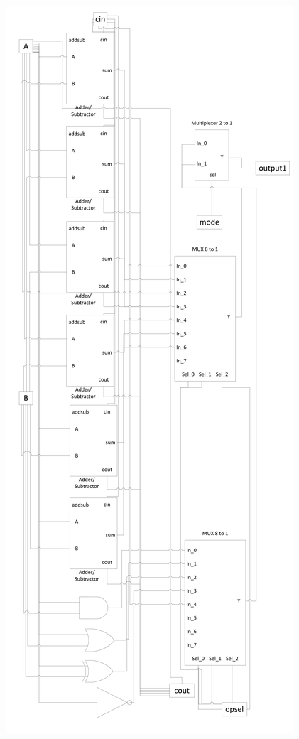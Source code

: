 \documentclass[paper=letter, fontsize=11pt]{scrartcl}
\numberwithin{equation}{section} %
\numberwithin{figure}{section} %
\numberwithin{table}{section} %
\begin{document}
			\includegraphics[scale=0.45]{Schematic}
				\label{fig:Schematic}
				
\end{document}
